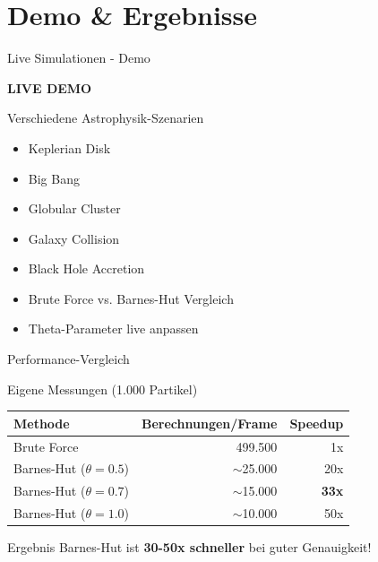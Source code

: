 \documentclass[xcolor=dvipsnames]{beamer}
\begin{document}
\section{Demo \& Ergebnisse}

\begin{frame}{Live Simulationen - Demo}
\begin{center}
\vspace{2cm}
{\Huge \textbf{LIVE DEMO}}

\vspace{1cm}
{\Large Verschiedene Astrophysik-Szenarien}

\vspace{0.5cm}
\begin{itemize}
    \item Keplerian Disk
    \item Big Bang
    \item Globular Cluster
    \item Galaxy Collision
    \item Black Hole Accretion
    \item Brute Force vs. Barnes-Hut Vergleich
    \item Theta-Parameter live anpassen
\end{itemize}
\end{center}
\end{frame}

\begin{frame}{Performance-Vergleich}
\begin{block}{Eigene Messungen (1.000 Partikel)}
\begin{table}
\centering
\begin{tabular}{l|r|r}
\textbf{Methode} & \textbf{Berechnungen/Frame} & \textbf{Speedup} \\ \hline
Brute Force & 499.500 & 1x \\
Barnes-Hut ($\theta=0.5$) & $\sim$25.000 & 20x \\
Barnes-Hut ($\theta=0.7$) & $\sim$15.000 & \textbf{33x} \\
Barnes-Hut ($\theta=1.0$) & $\sim$10.000 & 50x
\end{tabular}
\end{table}
\end{block}

\begin{alertblock}{Ergebnis}
Barnes-Hut ist \textbf{30-50x schneller} bei guter Genauigkeit!
\end{alertblock}
\end{frame}
\end{document}
